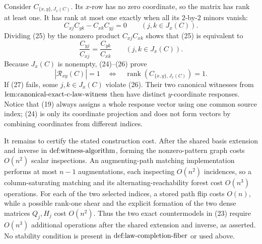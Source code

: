Consider \(C_{\{x,y\},J_x(C)}\).  Its \(x\)-row has no zero coordinate, so the matrix has rank at least one.  It has rank at most one exactly when all its \(2\)-by-\(2\) minors vanish:
\[
 C_{xj}C_{yk}-C_{xk}C_{yj}=0
 \qquad(j,k\in J_x(C)).                                                     \tag{25}
\]
Dividing (25) by the nonzero product \(C_{xj}C_{xk}\) shows that (25) is equivalent to
\[
 \frac{C_{yj}}{C_{xj}}=\frac{C_{yk}}{C_{xk}}
 \qquad(j,k\in J_x(C)).                                                     \tag{26}
\]
Because \(J_x(C)\) is nonempty, (24)--(26) prove
\[
 |\mathcal R_{xy}(C)|=1
 \quad\Longleftrightarrow\quad
 \operatorname{rank}\!\left(C_{\{x,y\},J_x(C)}\right)=1.                   \tag{27}
\]
If (27) fails, some \(j,k\in J_x(C)\) violate (26).  Their two canonical witnesses from
\(\textnormal{lem:canonical-exact-c-law-witness}\) then have distinct \(y\)-coordinate responses.  Notice that (19) always assigns a whole response vector using one common source index; (24) is only its coordinate projection and does not form vectors by combining coordinates from different indices.

It remains to certify the stated construction cost.  After the shared basis extension and inverse in
\(\textnormal{def:witness-algorithm}\), forming the nonzero-pattern graph costs \(O(n^2)\) scalar inspections.  An augmenting-path matching implementation performs at most \(n-1\) augmentations, each inspecting \(O(n^2)\) incidences, so a column-saturating matching and its alternating-reachability forest cost \(O(n^3)\) operations.  For each of the two selected indices, a stored path flip costs \(O(n)\), while a possible rank-one shear and the explicit formation of the two dense matrices \(Q_j,H_j\) cost \(O(n^2)\).  Thus the two exact countermodels in (23) require \(O(n^3)\) additional operations after the shared extension and inverse, as asserted.  No stability condition is present in \(\textnormal{def:law-completion-fiber}\) or used above.